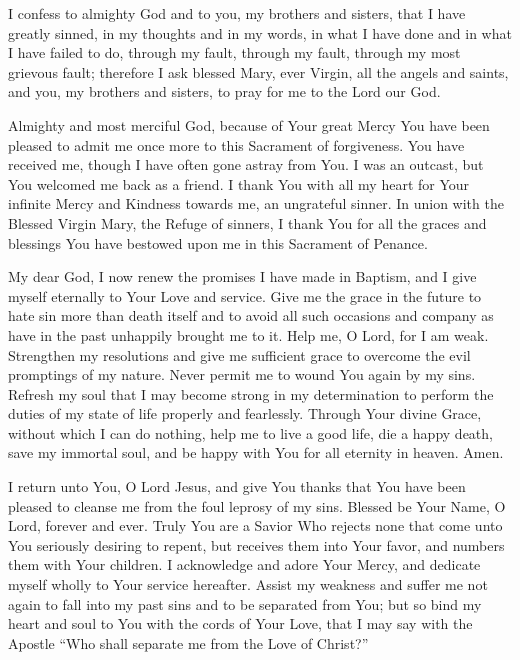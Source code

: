 I confess to almighty God and to you, my brothers and sisters, that I have greatly sinned, in my thoughts and in my words, in what I have done and in what I have failed to do, through my fault, through my fault, through my most grievous fault;
therefore I ask blessed Mary, ever Virgin, all the angels and saints, and you, my brothers and sisters, to pray for me to the Lord our God.

Almighty and most merciful God, because of Your great Mercy You have been pleased to admit me once more to this Sacrament of forgiveness.
You have received me, though I have often gone astray from You.
I was an outcast, but You welcomed me back as a friend.
I thank You with all my heart for Your infinite Mercy and Kindness towards me, an ungrateful sinner.
In union with the Blessed Virgin Mary, the Refuge of sinners, I thank You for all the graces and blessings You have bestowed upon me in this Sacrament of Penance.

My dear God, I now renew the promises I have made in Baptism, and I give myself eternally to Your Love and service.
Give me the grace in the future to hate sin more than death itself and to avoid all such occasions and company as have in the past unhappily brought me to it.
Help me, O Lord, for I am weak.
Strengthen my resolutions and give me sufficient grace to overcome the evil promptings of my nature.
Never permit me to wound You again by my sins.
Refresh my soul that I may become strong in my determination to perform the duties of my state of life properly and fearlessly.
Through Your divine Grace, without which I can do nothing, help me to live a good life, die a happy death, save my immortal soul, and be happy with You for all eternity in heaven. Amen.

I return unto You, O Lord Jesus, and give You thanks that You have been pleased to cleanse me from the foul leprosy of my sins.
Blessed be Your Name, O Lord, forever and ever.
Truly You are a Savior Who rejects none that come unto You seriously desiring to repent, but receives them into Your favor, and numbers them with Your children.
I acknowledge and adore Your Mercy, and dedicate myself wholly to Your service hereafter.
Assist my weakness and suffer me not again to fall into my past sins and to be separated from You;
but so bind my heart and soul to You with the cords of Your Love, that I may say with the Apostle ``Who shall separate me from the Love of Christ?''


